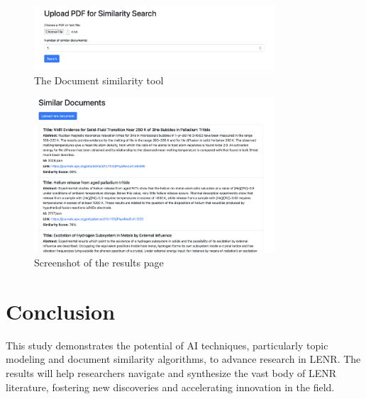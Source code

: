 \documentclass[12pt]{article}
\begin{document}
    \begin{figure}[h!]
        \centering
        \includegraphics[width=0.8\textwidth]{images/query.png}
        \caption{The Document similarity tool}
        \label{fig:Screenshot of the document similarity tool}
    \end{figure}
    \begin{figure}[h!]
        \centering
        \includegraphics[width=0.8\textwidth]{images/result.png}
        \caption{Screenshot of the results page}
        \label{fig:Screenshot of the results page}
    \end{figure}


\section{Conclusion}
    This study demonstrates the potential of AI techniques, particularly topic modeling and document similarity algorithms, to advance research in LENR. The results will help researchers navigate and synthesize the vast body of LENR literature, fostering new discoveries and accelerating innovation in the field.
\end{document}
